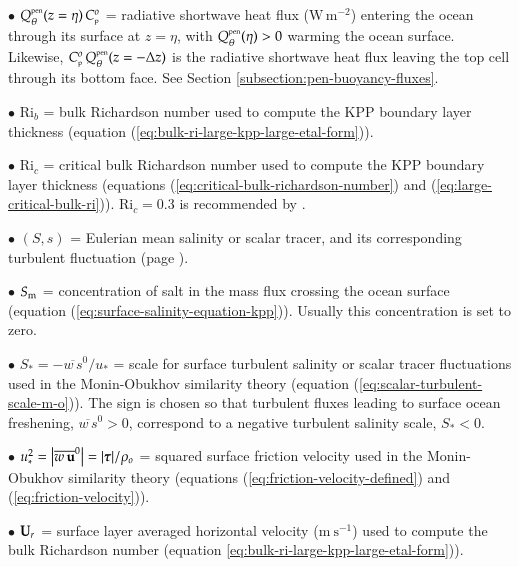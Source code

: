 \begin{trivlist}
\item[$\bullet$] $Q_{\theta}^{\mbox{\tiny pen}}(z=\eta) \, C_{\mbox{\tiny p}}^{o}$ = radiative
  shortwave heat flux ($\mbox{W} \, \mbox{m}^{-2}$) entering the ocean
  through its surface at $z=\eta$, with $Q_{\theta}^{\mbox{\tiny
      pen}}(\eta) > 0$ warming the ocean surface.  Likewise, $C_{\mbox{\tiny p}}^{o} \,
  Q_{\theta}^{\mbox{\tiny pen}}(z=-\Delta z)$ is the radiative
  shortwave heat flux leaving the top cell through its bottom face.
  See Section \ref{subsection:pen-buoyancy-fluxes}.

\item[$\bullet$] $\mbox{Ri}_{b}$ = bulk Richardson number used to
  compute the KPP boundary layer thickness (equation
  (\ref{eq:bulk-ri-large-kpp-large-etal-form})).

\item[$\bullet$] $\mbox{Ri}_{c}$ = critical bulk Richardson number
  used to compute the KPP boundary layer thickness (equations
  (\ref{eq:critical-bulk-richardson-number}) and
  (\ref{eq:large-critical-bulk-ri})).  $\mbox{Ri}_{c} = 0.3$ is
  recommended by \cite{LargeKPP}.

\item[$\bullet$] $(S,s)$ = Eulerian mean salinity or scalar tracer,
  and its corresponding turbulent fluctuation (page
  \pageref{Lambda_defined}).

\item[$\bullet$] $S_{\mbox{\scriptsize m}}$ = concentration of salt in the mass flux
  crossing the ocean surface (equation
  (\ref{eq:surface-salinity-equation-kpp})).  Usually this
  concentration is set to zero.

\item[$\bullet$] $S_{*} = -\overline{w \, s}^{0} / u_{*}$ = scale for
  surface turbulent salinity or scalar tracer fluctuations used in the
  Monin-Obukhov similarity theory (equation
  (\ref{eq:scalar-turbulent-scale-m-o})).  The sign is chosen so that
  turbulent fluxes leading to surface ocean freshening, $\overline{w
    \, s}^{0} > 0$, correspond to a negative turbulent salinity scale,
  $S_{*} < 0$.

\item[$\bullet$] $u_{*}^{2} = \left| \overline{w \, {\bf u}}^{0}
  \right| = | \mbox{\boldmath $\tau$} |/\rho_{o}$ = squared surface friction velocity
  used in the Monin-Obukhov similarity theory (equations
  (\ref{eq:friction-velocity-defined}) and
  (\ref{eq:friction-velocity})).

\item[$\bullet$] ${\bf U}_{r}$ = surface layer averaged horizontal
  velocity ($\mbox{m}~\mbox{s}^{-1}$) used to compute the bulk
  Richardson number (equation
  \ref{eq:bulk-ri-large-kpp-large-etal-form})).


\end{trivlist}
